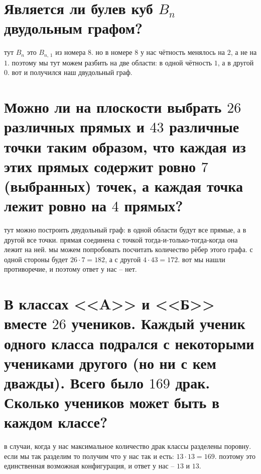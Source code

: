 \documentclass{article}
\begin{document}
  \section{Является ли булев куб $B_n$ двудольным графом?}
  тут $B_n$ это $B_{n,\, 1}$ из номера 8.
  но в номере 8 у нас чётность менялось на $2$, а не на $1$.
  поэтому мы тут можем разбить на две области: в одной чётность $1$, а в другой $0$.
  вот и получился наш двудольный граф.

  \section{Можно ли на плоскости выбрать $26$ различных прямых и $43$ различные точки таким образом, что каждая из этих прямых содержит ровно $7$ (выбранных) точек, а каждая точка лежит ровно на $4$ прямых?}
  тут можно построить двудольный граф:
  в одной области будут все прямые, а в другой все точки.
  прямая соединена с точкой тогда-и-только-тогда-когда она лежит на ней.
  мы можем попробовать посчитать количество рёбер этого графа.
  с одной стороны будет $26 \cdot 7 = 182$, а с другой $4 \cdot 43 = 172$.
  вот мы нашли противоречие, и поэтому ответ у нас -- нет.

  \section{В классах <<A>> и <<Б>> вместе $26$ учеников. Каждый ученик одного класса подрался с некоторыми учениками другого (но ни с кем дважды). Всего было $169$ драк. Сколько учеников может быть в каждом классе?}
  в случаи, когда у нас максимальное количество драк классы разделены поровну.
  если мы так разделим то получим что у нас так и есть: $13 \cdot 13 = 169$.
  поэтому это единственная возможная конфигурация, и ответ у нас -- $13$ и $13$.
\end{document}
